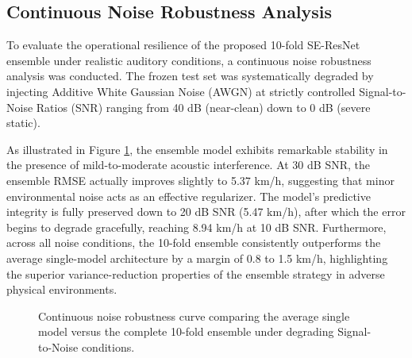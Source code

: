 \documentclass[conference]{IEEEtran}
\begin{document}
\subsection{Continuous Noise Robustness Analysis}
To evaluate the operational resilience of the proposed 10-fold SE-ResNet ensemble under realistic auditory conditions, a continuous noise robustness analysis was conducted. The frozen test set was systematically degraded by injecting Additive White Gaussian Noise (AWGN) at strictly controlled Signal-to-Noise Ratios (SNR) ranging from 40 dB (near-clean) down to 0 dB (severe static). 

As illustrated in Figure \ref{fig:noise_curve}, the ensemble model exhibits remarkable stability in the presence of mild-to-moderate acoustic interference. At 30 dB SNR, the ensemble RMSE actually improves slightly to 5.37 km/h, suggesting that minor environmental noise acts as an effective regularizer. The model's predictive integrity is fully preserved down to 20 dB SNR (5.47 km/h), after which the error begins to degrade gracefully, reaching 8.94 km/h at 10 dB SNR. Furthermore, across all noise conditions, the 10-fold ensemble consistently outperforms the average single-model architecture by a margin of 0.8 to 1.5 km/h, highlighting the superior variance-reduction properties of the ensemble strategy in adverse physical environments.

\begin{figure}[htbp]
\centering
{}
\caption{Continuous noise robustness curve comparing the average single model versus the complete 10-fold ensemble under degrading Signal-to-Noise conditions.}
\label{fig:noise_curve}
\end{figure}
\end{document}
